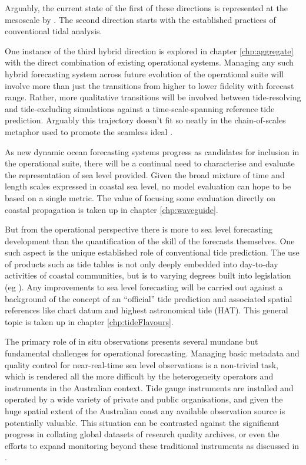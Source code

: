 Arguably, the current state of the first of these directions is represented at the mesoscale by \BL{}.   The second direction starts with the established practices of conventional tidal analysis.

One instance of the third hybrid direction is explored in chapter \ref{chp:aggregate} with the direct combination of existing operational systems.
Managing any such hybrid forecasting system across future evolution of the operational suite will involve more than just the transitions from higher to lower fidelity with forecast range.  Rather, more qualitative transitions will be involved between tide-resolving and tide-excluding simulations against a time-scale-spanning reference tide prediction.  Arguably this trajectory doesn't fit so neatly in the chain-of-scales metaphor used to promote the seamless ideal \citep{10.1175/bams-87-9-1195}.


As new dynamic ocean forecasting systems progress as candidates for inclusion in the operational suite, there will be a continual need to characterise and evaluate the representation of sea level provided.  Given the broad mixture of time and length scales expressed in coastal sea level, no model evaluation can hope to be based on a single metric.    The value of focusing some evaluation directly on coastal propagation is taken up in chapter \ref{chp:waveguide}.



But from the operational perspective there is more to sea level forecasting development than the quantification of the skill of the forecasts themselves.
One such aspect is the unique established role of conventional tide prediction.   The use of products such as tide tables is not only deeply embedded into day-to-day activities of coastal communities, but is to varying degrees built into legislation (eg \citep{AusNavAct2012}).   Any improvements to sea level forecasting will be carried out against a background of the concept of an ``official'' tide prediction and associated spatial references like chart datum and highest astronomical tide (HAT).    
This general topic is taken up in chapter \ref{chp:tideFlavours}.


The primary role of in situ observations presents several mundane but fundamental challenges for operational forecasting.
Managing basic metadata and quality control for near-real-time sea level observations is a non-trivial task, which is rendered all the more difficult by the heterogeneity operators and instruments in the Australian context.    Tide gauge instruments are installed and operated by a wide variety of private and public organisations, and given the huge spatial extent of the Australian coast any available observation source is potentially valuable. 
This situation can be contrasted against the significant progress in collating global datasets of research quality archives, or even the efforts to expand monitoring beyond these traditional instruments as discussed in \citet{10.3389/fmars.2019.00348}.




